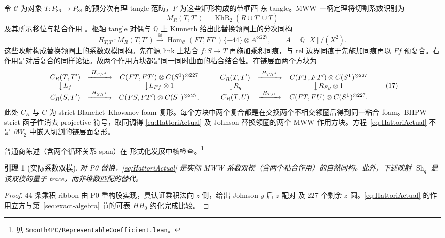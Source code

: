 \documentclass[11pt]{amsart}
\newtheorem{lemma}[theorem]{引理}
\theoremstyle{definition}
\theoremstyle{remark}
\newcommand{\Q}{\mathbb{Q}}
\newcommand{\KhR}{\operatorname{KhR}}
\begin{document}
令 $\mathcal C$ 为对象 $T:P_{86}\to P_{88}$ 的预分次有理 tangle 范畴，$F$ 为这些矩形构成的带框西-东 tangle。MWW 一柄定理将切割系数识别为
\[
M_R(T,T')=\KhR_2(R\cup T'\cup\overline T)
\]
及其所示移位与粘合作用
\cite[Theorem~4.7]{ManolescuWalkerWedrich2023}。枢轴 tangle 对偶与 $\Q$ 上 K\"unneth 给出此替换领圈上的分次同构
\begin{equation}\label{eq:HattoriActual}
H_{T,T'}:M_R(T,T')\xrightarrow{\cong}
\operatorname{Hom}_{\mathcal C}(FT,FT')\{-44\}
\otimes A^{\otimes227},
\qquad A=\Q[X]/(X^2).
\end{equation}
这些映射构成替换领圈上的系数双模同构。先在源 link 上粘合 $f:S\to T$ 再施加乘积同痕，与 rel 边界同痕于先施加同痕再以 $Ff$ 预复合。右作用是对后复合的同样论证。故两个作用方块都是同一同时曲面的粘合结合性。在链层面两个方块为
\[
\begin{array}{ccc}
C_R(T,T')&\xrightarrow{\ H_{T,T'}\ }&
C(FT,FT')\otimes C(S^1)^{\otimes227}\\
\big\downarrow {L_f}&&\big\downarrow {L_{Ff}\otimes1}\\
C_R(S,T')&\xrightarrow{\ H_{S,T'}\ }&
C(FS,FT')\otimes C(S^1)^{\otimes227},
\end{array}
\qquad
\begin{array}{ccc}
C_R(T,T')&\xrightarrow{\ H_{T,T'}\ }&
C(FT,FT')\otimes C(S^1)^{\otimes227}\\
\big\downarrow {R_g}&&\big\downarrow {R_{Fg}\otimes1}\\
C_R(T,U)&\xrightarrow{\ H_{T,U}\ }&
C(FT,FU)\otimes C(S^1)^{\otimes227}.
\end{array}
\tag{17}
\]
此处 $C_R$ 与 $C$ 为 strict Blanchet--Khovanov foam 复形。每个方块中两个复合都是在交换两个不相交领圈后得到同一粘合 foam。BHPW strict 函子性消去 projective 符号，取同调得 \eqref{eq:HattoriActual} 及 Johnson 替换领圈的两个 MWW 作用方块。方程~\eqref{eq:HattoriActual} 不是 $\partial W_2$ 中嵌入切割的链层面复形。

普通商陈述（含两个循环关系 span）在
形式化发展中核检查。\footnote{见
\texttt{Smooth4PC/RepresentableCoefficient.lean}。}

\begin{lemma}[实际系数双模]\label{lem:C1}
对 P0 替换，\eqref{eq:HattoriActual} 是实际 MWW 系数双模（含两个粘合作用）的自然同构。此外，下述映射 \(\operatorname{Sh}_q\) 是该双模的量子 trace，而非维数匹配的替代。
\end{lemma}

\begin{proof}
44 条乘积 ribbon 由 P0 重构股实现，具认证乘积法向 $z$-侧，给出 Johnson $y$-后-$z$ 配对
及 $227$ 个剩余 $z$-圆。\eqref{eq:HattoriActual} 的作用立方与第~\ref{sec:exact-algebra} 节的可表 $HH_0$ 约化完成比较。
\end{proof}
\end{document}
